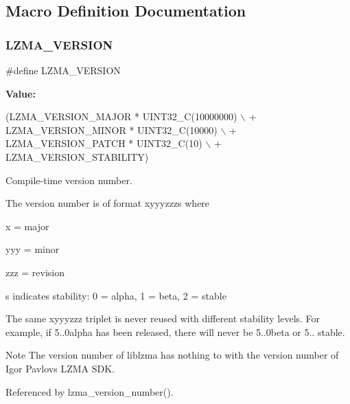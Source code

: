 \subsection{Macro Definition Documentation}
\mbox{\label{version_8h_a156c47ff34aa0c2b726d0daf799f10a0}} 
\subsubsection{L\+Z\+M\+A\+\_\+\+V\+E\+R\+S\+I\+ON}
{\footnotesize\ttfamily \#define L\+Z\+M\+A\+\_\+\+V\+E\+R\+S\+I\+ON}

{\bfseries Value\+:}
\begin{DoxyCode}
(LZMA\_VERSION\_MAJOR * UINT32\_C(10000000) \(\backslash\)
                + LZMA\_VERSION\_MINOR * UINT32\_C(10000) \(\backslash\)
                + LZMA\_VERSION\_PATCH * UINT32\_C(10) \(\backslash\)
                + LZMA\_VERSION\_STABILITY)
\end{DoxyCode}


Compile-\/time version number. 

The version number is of format xyyyzzzs where
\begin{DoxyItemize}
\item x = major
\item yyy = minor
\item zzz = revision
\item s indicates stability\+: 0 = alpha, 1 = beta, 2 = stable
\end{DoxyItemize}

The same xyyyzzz triplet is never reused with different stability levels. For example, if 5..\+0alpha has been released, there will never be 5..\+0beta or 5.. stable.

\begin{DoxyNote}{Note}
The version number of liblzma has nothing to with the version number of Igor Pavlov\textquotesingle{}s L\+Z\+MA S\+DK. 
\end{DoxyNote}


Referenced by lzma\+\_\+version\+\_\+number().

\mbox{\label{version_8h_a57bb143c993c305a53e9aade831a546c}} 
